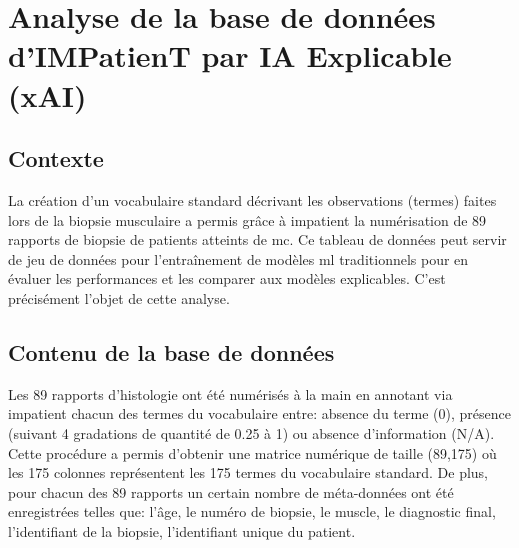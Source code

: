 \chapter{Analyse de la base de données d’IMPatienT par IA Explicable (xAI)}

\section{Contexte}
La création d'un vocabulaire standard décrivant les observations (termes) faites lors de la biopsie musculaire a permis grâce à \gls{impatient} la numérisation de 89 rapports de biopsie de patients atteints de \gls{mc}. Ce tableau de données peut servir de jeu de données pour l'entraînement de modèles \gls{ml} traditionnels pour en évaluer les performances et les comparer aux modèles explicables. C'est précisément l'objet de cette analyse.
\section{Contenu de la base de données}
Les 89 rapports d'histologie ont été numérisés à la main en annotant via \gls{impatient} chacun des termes du vocabulaire entre: absence du terme (0), présence (suivant 4 gradations de quantité de 0.25 à 1) ou absence d'information (N/A).  Cette procédure a permis d'obtenir une matrice numérique de taille (89,175) où les 175 colonnes représentent les 175 termes du vocabulaire standard. De plus, pour chacun des 89 rapports un certain nombre de méta-données ont été enregistrées telles que: l'âge, le numéro de biopsie, le muscle, le diagnostic final, l'identifiant de la biopsie, l'identifiant unique du patient.
